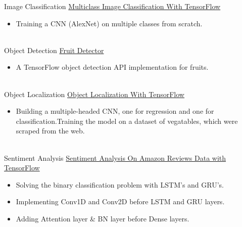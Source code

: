 \documentclass[letterpaper]{DS_class_file} %
\begin{document}
\begin{twenty} %
	\twentyitem
	{Image}
	{Classification}
	{\hspace{0.3cm}\href{https://github.com/MuhammedBuyukkinaci/TensorFlow-Multiclass-Image-Classification-using-CNN-s}{Multiclass Image Classification With TensorFlow}}
	{}
	{}
	{
		{\begin{itemize}
				\item Training a CNN (AlexNet) on multiple classes from scratch.
		\end{itemize}}
	}
	\\
	\twentyitem
	{Object}
	{Detection}
	{\hspace{0.3cm}\href{https://github.com/MuhammedBuyukkinaci/Fruit-Detector}{Fruit Detector}}
	{}
	{}
	{\begin{itemize}
			\item A TensorFlow object detection API implementation for fruits.      
	\end{itemize}}
	\\
	\twentyitem
	{Object}
	{Localization}
	{\hspace{0.3cm}\href{https://github.com/MuhammedBuyukkinaci/Object-Classification-and-Localization-with-TensorFlow}{Object Localization With TensorFlow}}
	{}
	{}
	{
	{\begin{itemize}
			\item Building a multiple-headed CNN, one for regression and one for classification.\hspace{0.2cm}Training the model on a dataset of vegatables,
			 which were scraped from the web.
	\end{itemize} }
	}
	\\
	\twentyitem
	{Sentiment}
	{Analysis}
	{\hspace{0.3cm}\href{https://github.com/MuhammedBuyukkinaci/TensorFlow-Sentiment-Analysis-on-Amazon-Reviews-Data}{Sentiment Analysis On Amazon Reviews Data with TensorFlow}}
	{}
	{}
	{
		{\begin{itemize}
				\item Solving the binary classification problem with LSTM's and GRU's.
				\item Implementing Conv1D and Conv2D before LSTM and GRU layers.
				\item Adding Attention layer \& BN layer before Dense layers.
		\end{itemize}}
	}
	\\
	
	
\end{twenty}
\end{document}

